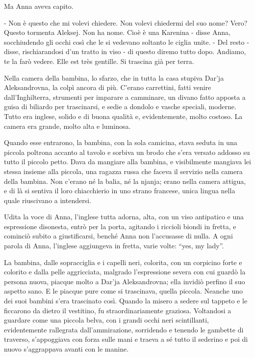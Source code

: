 Ma Anna aveva capito. 

- Non è questo che mi volevi chiedere. Non volevi chiedermi del suo nome? Vero? Questo tormenta Aleksej. Non ha nome. Cioè è una Karenina - disse Anna, socchiudendo gli occhi così che le si vedevano soltanto le ciglia unite. - Del resto - disse, rischiarandosi d'un tratto in viso - di questo diremo tutto dopo. Andiamo, te la farò vedere. Elle est très gentille. Si trascina già per terra. 

Nella camera della bambina, lo sfarzo, che in tutta la casa stupiva Dar'ja Aleksandrovna, la colpì ancora di più. C'erano carrettini, fatti venire dall'Inghilterra, strumenti per imparare a camminare, un divano fatto apposta a guisa di biliardo per trascinarsi, e sedie a dondolo e vasche speciali, moderne. Tutto era inglese, solido e di buona qualità e, evidentemente, molto costoso. La camera era grande, molto alta e luminosa. 

Quando esse entrarono, la bambina, con la sola camicina, stava seduta in una piccola poltrona accanto al tavolo e sorbiva un brodo che s'era versato addosso su tutto il piccolo petto. Dava da mangiare alla bambina, e visibilmente mangiava lei stessa insieme alla piccola, una ragazza russa che faceva il servizio nella camera della bambina. Non c'erano né la balia, né la njanja; erano nella camera attigua, e di là si sentiva il loro chiacchierio in uno strano francese, unica lingua nella quale riuscivano a intendersi. 

Udita la voce di Anna, l'inglese tutta adorna, alta, con un viso antipatico e una espressione disonesta, entrò per la porta, agitando i riccioli biondi in fretta, e cominciò subito a giustificarsi, benché Anna non l'accusasse di nulla. A ogni parola di Anna, l'inglese aggiungeva in fretta, varie volte: ``yes, my lady''. 

La bambina, dalle sopracciglia e i capelli neri, colorita, con un corpicino forte e colorito e dalla pelle aggricciata, malgrado l'espressione severa con cui guardò la persona nuova, piacque molto a Dar'ja Aleksandrovna; ella invidiò perfino il suo aspetto sano. E le piacque pure come si trascinava, quella piccola. Neanche uno dei suoi bambini s'era trascinato così. Quando la misero a sedere sul tappeto e le ficcarono da dietro il vestitino, fu straordinariamente graziosa. Voltandosi a guardare come una piccola belva, con i grandi occhi neri scintillanti, evidentemente rallegrata dall'ammirazione, sorridendo e tenendo le gambette di traverso, s'appoggiava con forza sulle mani e traeva a sé tutto il sederino e poi di nuovo s'aggrappava avanti con le manine. 

